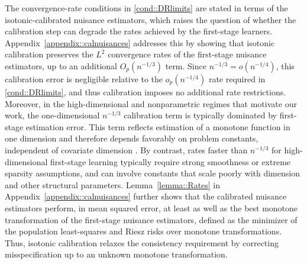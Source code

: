 \documentclass[11pt]{article}
\theoremstyle{plain}
\begin{document}


 
{\color{purple}
The convergence-rate conditions in \ref{cond::DRlimits} are stated
in terms of the isotonic-calibrated nuisance estimators, which raises the
question of whether the calibration step can degrade the rates achieved by the
first-stage learners. Appendix~\ref{appendix::calnuisances} addresses this by
showing that isotonic calibration preserves the \(L^2\) convergence rates of
the first-stage nuisance estimators, up to an additional \(O_p(n^{-1/3})\)
term. Since \(n^{-1/3}=o(n^{-1/4})\), this calibration error is negligible
relative to the \(o_p(n^{-1/4})\) rate required in \ref{cond::DRlimits}, and
thus calibration imposes no additional rate restrictions. Moreover, in the
high-dimensional and nonparametric regimes that motivate our work, the
one-dimensional \(n^{-1/3}\) calibration term is typically dominated by
first-stage estimation error. This term reflects estimation of a monotone
function in one dimension and therefore depends favorably on problem constants,
independent of covariate dimension \citep{chatterjee2013improved}. By contrast,
rates faster than \(n^{-1/3}\) for high-dimensional first-stage learning
typically require strong smoothness or extreme sparsity assumptions, and can
involve constants that scale poorly with dimension and other structural
parameters. Lemma~\ref{lemma::Rates} in Appendix~\ref{appendix::calnuisances} further shows
that the calibrated nuisance estimators perform, in mean squared error, at
least as well as the best monotone transformation of the first-stage nuisance
estimators, defined as the minimizer of the population least-squares and Riesz
risks over monotone transformations. Thus, isotonic calibration relaxes the
consistency requirement by correcting misspecification up to an unknown
monotone transformation.
}



 


\end{document}
